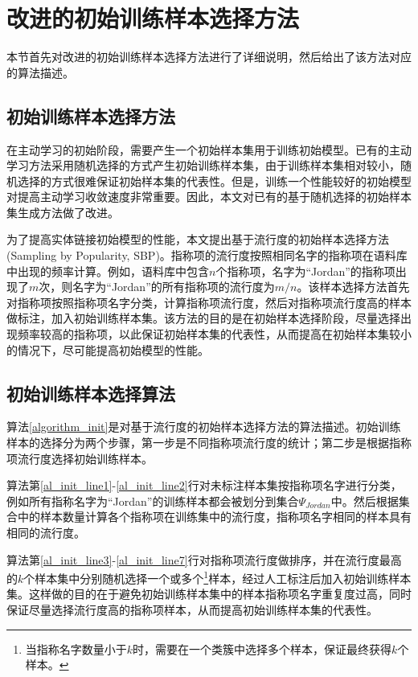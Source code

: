 \section{改进的初始训练样本选择方法}\label{section:al_init_gen}
本节首先对改进的初始训练样本选择方法进行了详细说明，然后给出了该方法对应的算法描述。

\subsection{初始训练样本选择方法}
在主动学习的初始阶段，需要产生一个初始样本集用于训练初始模型。已有的主动学习方法采用随机选择的方式产生初始训练样本集，由于训练样本集相对较小，随机选择的方式很难保证初始样本集的代表性。但是，训练一个性能较好的初始模型对提高主动学习收敛速度非常重要。因此，本文对已有的基于随机选择的初始样本集生成方法做了改进。

为了提高实体链接初始模型的性能，本文提出基于流行度的初始样本选择方法(Sampling by Popularity, SBP)。指称项的流行度按照相同名字的指称项在语料库中出现的频率计算。例如，语料库中包含$n$个指称项，名字为“Jordan”的指称项出现了$m$次，则名字为“Jordan”的所有指称项的流行度为$m/n$。该样本选择方法首先对指称项按照指称项名字分类，计算指称项流行度，然后对指称项流行度高的样本做标注，加入初始训练样本集。该方法的目的是在初始样本选择阶段，尽量选择出现频率较高的指称项，以此保证初始样本集的代表性，从而提高在初始样本集较小的情况下，尽可能提高初始模型的性能。

\subsection{初始训练样本选择算法}
算法\ref{algorithm_init}是对基于流行度的初始样本选择方法的算法描述。初始训练样本的选择分为两个步骤，第一步是不同指称项流行度的统计；第二步是根据指称项流行度选择初始训练样本。

算法第\ref{al_init_line1}-\ref{al_init_line2}行对未标注样本集按指称项名字进行分类，例如所有指称名字为“Jordan”的训练样本都会被划分到集合$\Psi_{Jordan}$中。然后根据集合中的样本数量计算各个指称项在训练集中的流行度，指称项名字相同的样本具有相同的流行度。

算法第\ref{al_init_line3}-\ref{al_init_line7}行对指称项流行度做排序，并在流行度最高的$k$个样本集中分别随机选择一个或多个\footnote{当指称名字数量小于$k$时，需要在一个类簇中选择多个样本，保证最终获得$k$个样本。}样本，经过人工标注后加入初始训练样本集。这样做的目的在于避免初始训练样本集中的样本指称项名字重复度过高，同时保证尽量选择流行度高的指称项样本，从而提高初始训练样本集的代表性。

